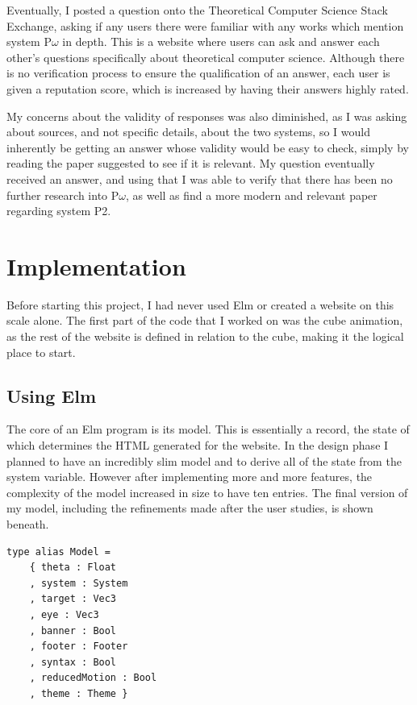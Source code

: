 \documentclass{l4proj}
\begin{document}
Eventually, I posted a question onto the Theoretical Computer Science Stack Exchange, asking if any users there were familiar with any works which mention system P\underline{$\omega$} in depth. This is a website where users can ask and answer each other's questions specifically about theoretical computer science.  Although there is no verification process to ensure the qualification of an answer, each user is given a reputation score, which is increased by having their answers highly rated.  

My concerns about the validity of responses was also diminished, as I was asking about sources, and not specific details, about the two systems, so I would inherently be getting an answer whose validity would be easy to check, simply by reading the paper suggested to see if it is relevant.  My question eventually received an answer, and using that I was able to verify that there has been no further research into P\underline{$\omega$}, as well as find a more modern and relevant paper regarding system P2.


\chapter{Implementation}

Before starting this project, I had never used Elm or created a website on this scale alone.  The first part of the code that I worked on was the cube animation, as the rest of the website is defined in relation to the cube, making it the logical place to start.

\section{Using Elm}

The core of an Elm program is its model.  This is essentially a record, the state of which determines the HTML generated for the website.  In the design phase I planned to have an incredibly slim model and to derive all of the state from the system variable.  However after implementing more and more features, the complexity of the model increased in size to have ten entries.  The final version of my model, including the refinements made after the user studies, is shown beneath.

\begin{lstlisting}
type alias Model =
    { theta : Float
    , system : System
    , target : Vec3
    , eye : Vec3
    , banner : Bool
    , footer : Footer
    , syntax : Bool
    , reducedMotion : Bool
    , theme : Theme }
\end{lstlisting}
\end{document}
